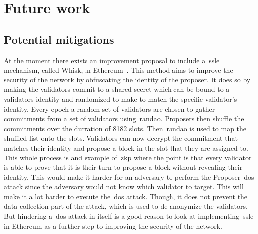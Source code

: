 

\section{Future work}\label{sec:future-works}

\subsection{Potential mitigations}\label{subsec:potential-mitigations}
At the moment there exists an improvement proposal
to include a~\gls{ssle} mechanism, called Whisk, in Ethereum~\cite{EthereumResearchSSLE2024}.
This method aims to improve the security of the network by obfuscating the identity of the proposer.
It does so by making the validators commit to a shared secret which can be bound to a validators identity and randomized to make to match the specific validator's identity.
Every epoch a random set of validators are chosen to gather commitments from a set of validators using~\gls{randao}.
Proposers then shuffle the commitments over the durration of 8182 slots.
Then~\gls{randao} is used to map the shuffled list onto the slots.
Validators can now decrypt the commitment that matches their identity and propose a block in the slot that they are assigned to.
This whole process is and example of~\gls{zkp} where the point is that every validator is able to prove that it is their turn to propose a block without revealing their identity.
This would make it harder
for an adversary to perform the Proposer~\gls{dos} attack since the adversary would not know which validator to target.
This will make it a lot harder to execute the~\gls{dos} attack.
Though, it does not prevent the data collection part of the attack, which is used to de-anonymize the validators.
But hindering a~\gls{dos} attack in itself is a good reason
to look at implementing~\gls{ssle} in Ethereum as a further step to improving the security of the network.
